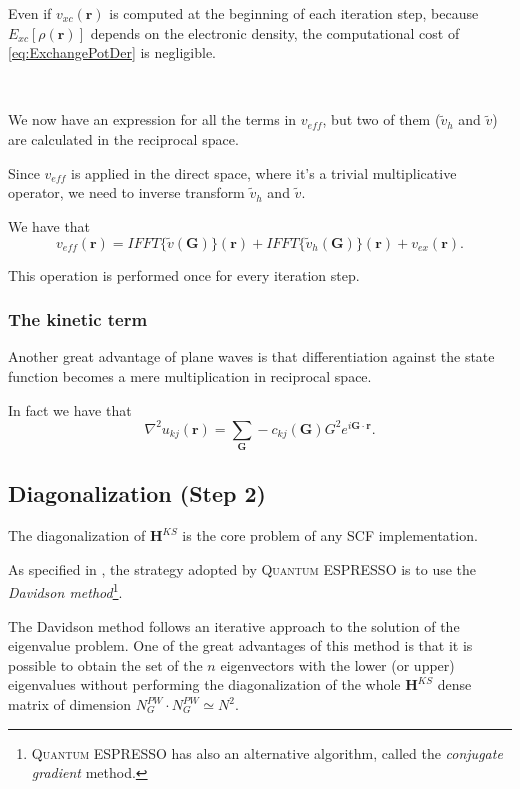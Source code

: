 \documentclass[a4paper,12pt]{article}
\newcommand\mf[1]{\mathbf{#1}}
\newcommand\dens{\rho(\mathbf{r})}
\newcommand\erre{\mathbf{r}}
\newcommand\GI{\mathbf{G}}
\newcommand\QE{\textsc{Quantum} ESPRESSO }
\begin{document}
Even if $v_{xc}(\erre)$ is computed at the beginning of each iteration step, because $E_{xc}[\dens]$ depends on the electronic density, the computational cost of \eqref{eq:ExchangePotDer} is negligible.


~


We now have an expression for all the terms in $v_{eff}$, but two of them ($\tilde{v}_{h}$ and $\tilde{v}$) are calculated in the reciprocal space.

Since $v_{eff}$ is applied in the direct space, where it's a trivial multiplicative operator, we need to inverse transform $\tilde{v}_{h}$ and $\tilde{v}$.

We have that
\begin{equation}
	v_{eff}(\erre) = IFFT\{\tilde{v}(\mf{G})\}(\erre) + IFFT\{\tilde{v}_{h}(\mf{G})\}(\erre) + v_{ex}(\erre).
\end{equation}

This operation is performed once for every iteration step.

\subsubsection{The kinetic term}\label{sec:KineticTerm}

Another great advantage of plane waves is that differentiation against the state function becomes a mere multiplication in reciprocal space.

In fact we have that 
\begin{equation}
	\nabla^2 u_{kj}(\erre) = \sum_{\mf{G}} - c_{kj}(\mf{G})  G^2  e^{i \GI  \cdot \erre}.
\end{equation}


\subsection{Diagonalization (Step 2)}\label{sec:Diagonalization}
The diagonalization of $\mf{H}^{KS}$ is the core problem of any SCF implementation.

As specified in \cite[Appendix A.2]{QE}, the strategy adopted by \QE is to use the \textit{Davidson method}\cite{Davidson}\footnote{\QE has also an alternative algorithm, called the \textit{conjugate gradient} method.}.

The Davidson method follows an iterative approach to the solution of the eigenvalue problem.
One of the great advantages of this method is that it is possible to obtain the set of the $n$ eigenvectors with the lower (or upper) eigenvalues without performing the diagonalization of the whole $\mf{H}^{KS}$ dense matrix of dimension $N_{G}^{PW} \cdot N_{G}^{PW} \simeq N^2$.
\end{document}
